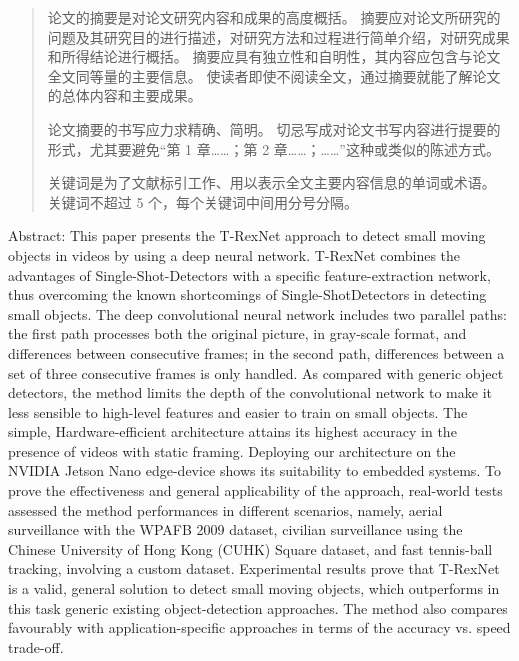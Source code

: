 

\begin{abstract}
  论文的摘要是对论文研究内容和成果的高度概括。
  摘要应对论文所研究的问题及其研究目的进行描述，对研究方法和过程进行简单介绍，对研究成果和所得结论进行概括。
  摘要应具有独立性和自明性，其内容应包含与论文全文同等量的主要信息。
  使读者即使不阅读全文，通过摘要就能了解论文的总体内容和主要成果。

  论文摘要的书写应力求精确、简明。
  切忌写成对论文书写内容进行提要的形式，尤其要避免“第 1 章……；第 2 章……；……”这种或类似的陈述方式。

  关键词是为了文献标引工作、用以表示全文主要内容信息的单词或术语。
  关键词不超过 5 个，每个关键词中间用分号分隔。

\end{abstract}

\begin{abstract*}

    Abstract: This paper presents the T-RexNet approach to detect small moving objects in videos by
using a deep neural network. T-RexNet combines the advantages of Single-Shot-Detectors with
a specific feature-extraction network, thus overcoming the known shortcomings of Single-ShotDetectors in detecting small objects. The deep convolutional neural network includes two parallel
paths: the first path processes both the original picture, in gray-scale format, and differences between
consecutive frames; in the second path, differences between a set of three consecutive frames is only
handled. As compared with generic object detectors, the method limits the depth of the convolutional
network to make it less sensible to high-level features and easier to train on small objects. The simple,
Hardware-efficient architecture attains its highest accuracy in the presence of videos with static
framing. Deploying our architecture on the NVIDIA Jetson Nano edge-device shows its suitability to
embedded systems. To prove the effectiveness and general applicability of the approach, real-world
tests assessed the method performances in different scenarios, namely, aerial surveillance with the
WPAFB 2009 dataset, civilian surveillance using the Chinese University of Hong Kong (CUHK)
Square dataset, and fast tennis-ball tracking, involving a custom dataset. Experimental results prove
that T-RexNet is a valid, general solution to detect small moving objects, which outperforms in
this task generic existing object-detection approaches. The method also compares favourably with
application-specific approaches in terms of the accuracy vs. speed trade-off.


\end{abstract*}
